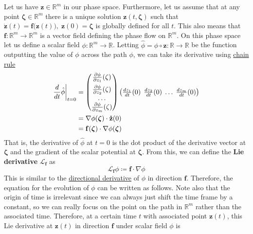       Let us have $\mathbf{z} \in \mathbb{R}^m$ in our phase space. Furthermore, let us assume that at any point $\boldsymbol{\zeta} \in \mathbb{R}^m$ there is a unique solution $\mathbf{z}(t, \boldsymbol{\zeta})$ such that $\mathbf{\dot{z}}(t) = \mathbf{f}\big(\mathbf{z}(t)\big), \; \mathbf{z}(0) = \boldsymbol{\zeta}$ is globally defined for all $t$. This also means that $\mathbf{f}: \mathbb{R}^m \to \mathbb{R}^m$ is a vector field defining the phase flow on $\mathbb{R}^m$. On this phase space let us define a scalar field $\phi: \mathbb{R}^m \to \mathbb{R}$. Letting $\hat{\phi} = \phi \circ \mathbf{z}: \mathbb{R} \to \mathbb{R}$ be the function outputting the value of $\phi$ across the path $\phi$, we can take its derivative using \hyperref[mv-thm:chain-rule]{chain rule}
      \begin{align*}
        \frac{d}{dt} \hat{\phi} \bigg|_{t=0} & = \begin{pmatrix}
        \frac{\partial \phi}{\partial z_1} (\zeta) \\[0.5em]
        \frac{\partial \phi}{\partial z_2} (\zeta) \\
        \ldots \\ 
        \frac{\partial \phi}{\partial z_m} (\zeta) \end{pmatrix} 
        \begin{pmatrix}
        \frac{d z_1}{dt} (0) &\hspace{-2mm} \frac{d z_2}{dt} (0) &\hspace{-2mm} \ldots &\hspace{-2mm} \frac{d z_m}{dt} (0) \end{pmatrix} \\
        & = \nabla \phi(\boldsymbol{\zeta}) \cdot \mathbf{\dot{z}} (0) \\ 
        & = \mathbf{f}(\boldsymbol{\zeta}) \cdot \nabla \phi(\boldsymbol{\zeta}) 
      \end{align*}
      That is, the derivative of $\hat{\phi}$ at $t = 0$ is the dot product of the derivative vector at $\boldsymbol{\zeta}$ and the gradient of the scalar potential at $\boldsymbol{\zeta}$. From this, we can define the \textbf{Lie derivative} $\mathcal{L}_\mathbf{f}$ as 
      \begin{equation}
        \mathcal{L}_\mathbf{f} \phi \coloneqq \mathbf{f} \cdot \nabla \phi
      \end{equation}
      This is similar to the \hyperref[mv-def:directional-derivative]{directional derivative} of $\phi$ in direction $\mathbf{f}$. Therefore, the equation for the evolution of $\phi$ can be written as follows. Note also that the origin of time is irrelevant since we can always just shift the time frame by a constant, so we can really focus on the point on the path in $\mathbb{R}^m$ rather than the associated time. Therefore, at a certain time $t$ with associated point $\mathbf{z}(t)$, this Lie derivative at $\mathbf{z}(t)$ in direction $\mathbf{f}$ under scalar field $\phi$ is 
